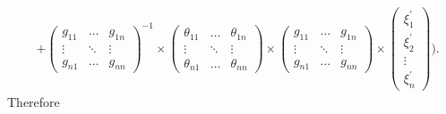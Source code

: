 \documentclass[a4paper,10pt]{amsart}
\begin{document}
\begin{align*}
   &+ 
    \begin{pmatrix}
       g_{11} & \ldots & g_{1n}\\
       \vdots      & \ddots & \vdots \\
       g_{n1} & \ldots & g_{nn}
    \end{pmatrix}^{-1} \times 
    \begin{pmatrix}
       \theta_{11} & \ldots & \theta_{1n}\\
       \vdots      & \ddots & \vdots \\
       \theta_{n1} & \ldots & \theta_{nn}
   \end{pmatrix} \times
    \begin{pmatrix}
       g_{11} & \ldots & g_{1n}\\
       \vdots      & \ddots & \vdots \\
       g_{n1} & \ldots & g_{nn}
   \end{pmatrix} \times
    \begin{pmatrix}
       \xi_{1}^{'}\\
       \xi_{2}^{'}\\
       \vdots\\
       \xi_{n}^{'}
   \end{pmatrix}
    ).
\end{align*}
Therefore
\end{document}
